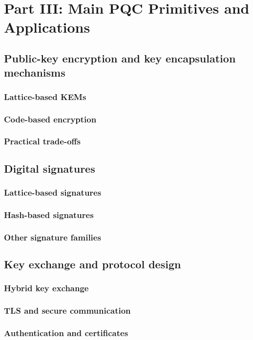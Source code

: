 \part{Part III: Main PQC Primitives and Applications}
\chapter{Public-key encryption and key encapsulation mechanisms}
\section{Lattice-based KEMs}
\section{Code-based encryption}
\section{Practical trade-offs}

\chapter{Digital signatures}
\section{Lattice-based signatures}
\section{Hash-based signatures}
\section{Other signature families}

\chapter{Key exchange and protocol design}
\section{Hybrid key exchange}
\section{TLS and secure communication}
\section{Authentication and certificates}

